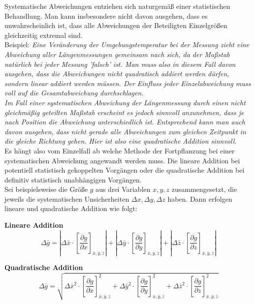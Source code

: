 Systematische Abweichungen entziehen sich naturgemäß einer statistischen Behandlung. Man kann insbesondere nicht davon ausgehen, dass es unwahrscheinlich ist,
dass alle Abweichungen der Beteiligten Einzelgrößen gleichzeitig extremal sind.\\

Beispiel:
\textit{Eine Veränderung der Umgebungstemperatur bei der Messung zieht eine Abweichung aller Längenmessungen gemeinsam nach sich, da der Maßstab natürlich bei jeder Messung
'falsch' ist. Man muss also in diesem Fall davon ausgehen, dass die Abweichungen nicht quadratisch addiert werden dürfen, sondern linear addiert werden müssen. Der Einfluss jeder
Einzelabweichung muss voll auf die Gesamtabweichung durchschlagen.}\\

\textit{Im Fall einer systematischen Abweichung der Längenmessung durch einen nicht gleichmäßig geteilten Maßstab erscheint es jedoch sinnvoll anzunehmen, dass je nach Position die Abweichung unterschiedlich ist. Entsprechend kann man auch davon ausgehen, dass nicht gerade alle Abweichungen zum gleichen Zeitpunkt in die gleiche Richtung gehen. Hier ist also eine quadratische Addition sinnvoll.}\\

Es hängt also vom Einzelfall ab welche Methode der Fortpflanzung bei einer systematischen Abweichung angewandt werden muss. Die lineare Addition bei potentiell statistisch gekoppelten Vorgängen oder die quadratische Addition bei definitiv statistisch unabhängigen Vorgängen.\\
Sei beispielsweise die Größe $g$ aus drei Variablen $x, y, z$ zusammengesetzt, die jeweils die systematischen Unsicherheiten $\Delta x, \Delta y, \Delta z$ haben. Dann erfolgen lineare und quadratische Addition wie folgt:

\textbf{Lineare Addition}
\begin{equation} \label{eq:error_lin_add}
	\Delta\bar{g} = \left|\Delta\bar{x}\cdot \left[\frac{\partial g}{\partial x}\right]_{\bar{x}, \bar{y}, \bar{z}}\right|
								+ \left|\Delta\bar{y}\cdot \left[\frac{\partial g}{\partial y}\right]_{\bar{x}, \bar{y}, \bar{z}}\right|
								+ \left|\Delta\bar{z}\cdot \left[\frac{\partial g}{\partial z}\right]_{\bar{x}, \bar{y}, \bar{z}}\right|
\end{equation}

\textbf{Quadratische Addition}
\begin{equation} \label{eq:error_quad_add}
	\Delta\bar{g} = \sqrt{\Delta\bar{x}^2\cdot \left[\frac{\partial g}{\partial x}\right]^2_{\bar{x}, \bar{y}, \bar{z}}
											+ \Delta\bar{y}^2\cdot \left[\frac{\partial g}{\partial y}\right]^2_{\bar{x}, \bar{y}, \bar{z}}
											+ \Delta\bar{z}^2\cdot \left[\frac{\partial g}{\partial z}\right]^2_{\bar{x}, \bar{y}, \bar{z}}}
\end{equation}
